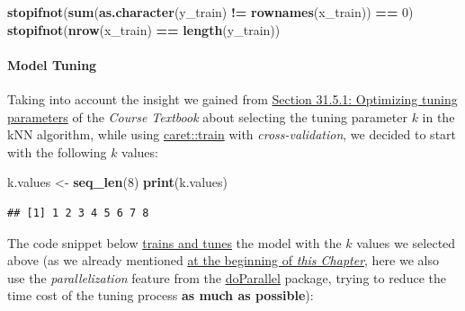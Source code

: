 \documentclass[
]{report}
\newenvironment{Shaded}{\begin{snugshade}}{\end{snugshade}}
\newcommand{\DecValTok}[1]{\textcolor[rgb]{0.00,0.00,0.81}{#1}}
\newcommand{\FunctionTok}[1]{\textcolor[rgb]{0.13,0.29,0.53}{\textbf{#1}}}
\newcommand{\NormalTok}[1]{#1}
\newcommand{\OtherTok}[1]{\textcolor[rgb]{0.56,0.35,0.01}{#1}}
\newcommand{\SpecialCharTok}[1]{\textcolor[rgb]{0.81,0.36,0.00}{\textbf{#1}}}
\begin{document}
\begin{Shaded}
\begin{Highlighting}[]
\FunctionTok{stopifnot}\NormalTok{(}\FunctionTok{sum}\NormalTok{(}\FunctionTok{as.character}\NormalTok{(y\_train) }\SpecialCharTok{!=} \FunctionTok{rownames}\NormalTok{(x\_train)) }\SpecialCharTok{==} \DecValTok{0}\NormalTok{)}
\FunctionTok{stopifnot}\NormalTok{(}\FunctionTok{nrow}\NormalTok{(x\_train) }\SpecialCharTok{==} \FunctionTok{length}\NormalTok{(y\_train))}
\end{Highlighting}
\end{Shaded}

\paragraph{Model Tuning}\label{knn_pca_mcc.tuning}

\hfill\break

Taking into account the insight we gained from \href{https://rafalab.dfci.harvard.edu/dsbook-part-2/ml/ml-in-practice.html\#optimizing-tuning-parameters}{Section 31.5.1: Optimizing tuning parameters} of the \emph{Course Textbook} about selecting the tuning parameter \(k\) in the kNN algorithm, while using \href{https://cran.r-project.org/web/packages/caret/refman/caret.html\#train}{caret::train} with \emph{cross-validation}, we decided to start with the following \(k\) values:

\begin{Shaded}
\begin{Highlighting}[]
\NormalTok{k.values }\OtherTok{\textless{}{-}} \FunctionTok{seq\_len}\NormalTok{(}\DecValTok{8}\NormalTok{)}
\FunctionTok{print}\NormalTok{(k.values)}
\end{Highlighting}
\end{Shaded}

\begin{verbatim}
## [1] 1 2 3 4 5 6 7 8
\end{verbatim}

\newpage

The code snippet below \href{https://github.com/AzKurban-edX-DS/edx.capstone.choose-your-own/blob/main/r/models/knn\%2Bpca-mcc/1.knn\%2Bpca.build\%26tune.R\#L105-L131}{trains and tunes} the model with the \(k\) values we selected above (as we already mentioned \hyperref[chapter_MA]{at the beginning of \emph{this Chapter}}, here we also use the \emph{parallelization} feature from the \href{https://cran.r-project.org/web/packages/doParallel/index.html}{doParallel} package\autocite{IDS2_31.4,IDS2_31.5.1}, trying to reduce the time cost of the tuning process \textbf{as much as possible}):
\end{document}
